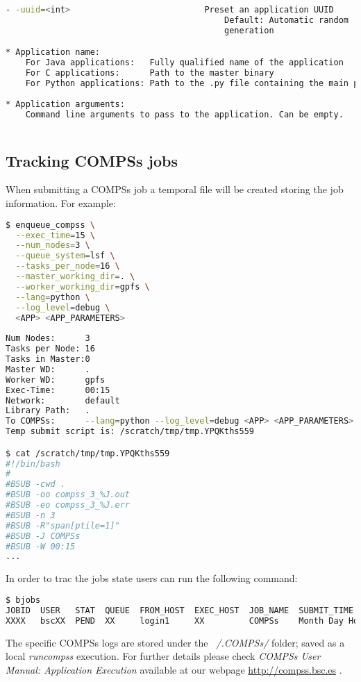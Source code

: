 \begin{lstlisting}[language=bash]
    - -uuid=<int>                           Preset an application UUID
                                            Default: Automatic random 
                                            generation

* Application name:
    For Java applications:   Fully qualified name of the application
    For C applications:      Path to the master binary
    For Python applications: Path to the .py file containing the main program
    
* Application arguments:
    Command line arguments to pass to the application. Can be empty. 
                                            
\end{lstlisting}

\subsection{Tracking COMPSs jobs}
When submitting a COMPSs job a temporal file will be created storing the job information. For example:
\begin{lstlisting}[language=bash]
$ enqueue_compss \
  --exec_time=15 \
  --num_nodes=3 \
  --queue_system=lsf \
  --tasks_per_node=16 \
  --master_working_dir=. \
  --worker_working_dir=gpfs \
  --lang=python \
  --log_level=debug \
  <APP> <APP_PARAMETERS>
  
Num Nodes:      3
Tasks per Node: 16
Tasks in Master:0
Master WD:      .
Worker WD:      gpfs
Exec-Time:      00:15
Network:        default
Library Path:   .
To COMPSs:      --lang=python --log_level=debug <APP> <APP_PARAMETERS>
Temp submit script is: /scratch/tmp/tmp.YPQKths559

$ cat /scratch/tmp/tmp.YPQKths559
#!/bin/bash
#
#BSUB -cwd . 
#BSUB -oo compss_3_%J.out
#BSUB -eo compss_3_%J.err
#BSUB -n 3
#BSUB -R"span[ptile=1]" 
#BSUB -J COMPSs
#BSUB -W 00:15 
...
\end{lstlisting}

In order to trac the jobs state users can run the following command:
\begin{lstlisting}[language=bash]
$ bjobs
JOBID  USER   STAT  QUEUE  FROM_HOST  EXEC_HOST  JOB_NAME  SUBMIT_TIME
XXXX   bscXX  PEND  XX     login1     XX         COMPSs    Month Day Hour
\end{lstlisting}

The specific COMPSs logs are stored under the \textit{~/.COMPSs/} folder; saved as a local \textit{runcompss} execution. For further 
details please check \textit{COMPSs User Manual: Application Execution} available at our webpage \url{http://compss.bsc.es} .

